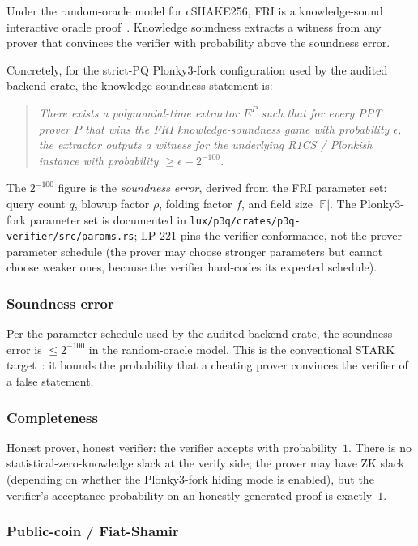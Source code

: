 Under the random-oracle model for cSHAKE256, FRI is a knowledge-sound
interactive oracle proof~\cite{frieprint,starkeprint}. Knowledge
soundness extracts a witness from any prover that convinces the
verifier with probability above the soundness error.

Concretely, for the strict-PQ Plonky3-fork configuration used by the
audited backend crate, the knowledge-soundness statement is:

\begin{quote}
\emph{There exists a polynomial-time extractor $E^{P}$ such that for
every PPT prover $P$ that wins the FRI knowledge-soundness game with
probability $\epsilon$, the extractor outputs a witness for the
underlying R1CS / Plonkish instance with probability
$\ge \epsilon - 2^{-100}$.}
\end{quote}

The $2^{-100}$ figure is the \emph{soundness error}, derived from
the FRI parameter set: query count $q$, blowup factor $\rho$,
folding factor $f$, and field size $|\mathbb{F}|$. The Plonky3-fork
parameter set is documented in
\texttt{lux/p3q/crates/p3q-verifier/src/params.rs}; LP-221 pins
the verifier-conformance, not the prover parameter schedule (the
prover may choose stronger parameters but cannot choose weaker
ones, because the verifier hard-codes its expected schedule).

\subsubsection{Soundness error}

Per the parameter schedule used by the audited backend crate, the
soundness error is $\le 2^{-100}$ in the random-oracle model. This
is the conventional STARK target~\cite{starkeprint}: it bounds the
probability that a cheating prover convinces the verifier of a
false statement.

\subsubsection{Completeness}

Honest prover, honest verifier: the verifier accepts with
probability~$1$. There is no statistical-zero-knowledge slack at
the verify side; the prover may have ZK slack (depending on whether
the Plonky3-fork hiding mode is enabled), but the verifier's
acceptance probability on an honestly-generated proof is exactly~$1$.

\subsubsection{Public-coin / Fiat-Shamir}

